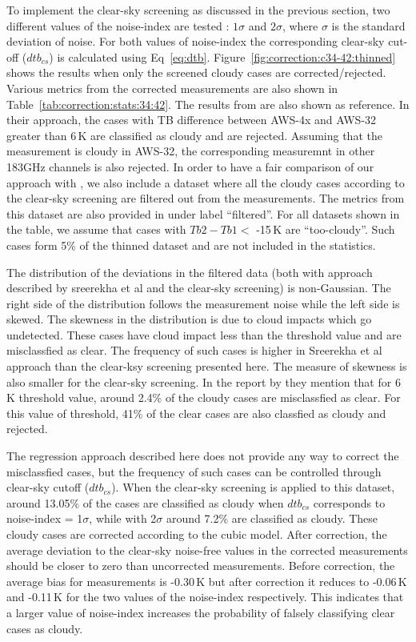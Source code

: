 \documentclass[12pt]{article}
\begin{document}
To implement the clear-sky screening as discussed in the previous section, two different values of the noise-index are tested : $1\sigma$ and  $2\sigma$, where $\sigma$ is the standard deviation of noise. For both values of noise-index the corresponding clear-sky cut-off ($dtb_{cs}$) is calculated using Eq~\ref{eq:dtb}. Figure~\ref{fig:correction:c34-42:thinned} shows the results when only the screened cloudy cases are corrected/rejected. Various metrics from the corrected measurements are also shown in Table~\ref{tab:correction:stats:34:42}. The results from \cite{rekha2012potential} are also shown as reference. In their approach, the cases with TB difference between AWS-4x and AWS-32 greater than 6\,K are classified as cloudy and are rejected. Assuming that the measurement is cloudy in AWS-32, the corresponding measuremnt in other 183GHz channels is also rejected. In order to have a fair comparison of our approach with  \cite{rekha2012potential}, we also include a dataset where all the cloudy cases according to the clear-sky screening are filtered out from the measurements. The metrics from this dataset are also provided in under label ``filtered''.  For all datasets shown in the table, we assume that cases with $Tb2-Tb1 < $ -15\,K are ``too-cloudy''. Such cases form 5\% of the thinned dataset and are not included in the statistics. 

The distribution of the deviations in the filtered data (both with approach described by sreerekha et al and the clear-sky screening) is non-Gaussian.  The right side of the distribution follows the measurement noise while the left side is skewed. The skewness in the distribution is due to cloud impacts which go undetected. These cases have cloud impact less than the threshold value and are misclassfied as clear. The frequency of such cases is higher in Sreerekha et al approach than the clear-ksy screening presented here. The measure of skewness is also smaller for the clear-sky screening. In the report by \cite{rekha2012potential} they mention that for 6\,K threshold value, around 2.4\% of the cloudy cases are misclassfied as clear. For this value of threshold, 41\% of the clear cases are also classfied as cloudy and rejected.  

The regression approach described here does not provide any way to correct the misclassfied cases, but the frequency of such cases can be controlled through clear-sky cutoff ($dtb_{cs}$). When the clear-sky screening is applied to this dataset, around 13.05\% of the cases are classified as cloudy when $dtb_{cs}$ corresponds to noise-index = 1$\sigma$, while with 2$\sigma$ around 7.2\% are classified as cloudy. These cloudy cases are corrected according to the cubic model. After correction, the average deviation to the clear-sky noise-free values in the corrected measurements should be closer to zero than uncorrected measurements. Before correction, the average bias for measurements is -0.30\,K but after correction it reduces to -0.06\,K and -0.11\,K for the two values of the noise-index respectively. This indicates that a larger value of noise-index increases the probability of falsely classifying clear cases as cloudy. 
%
\end{document}
